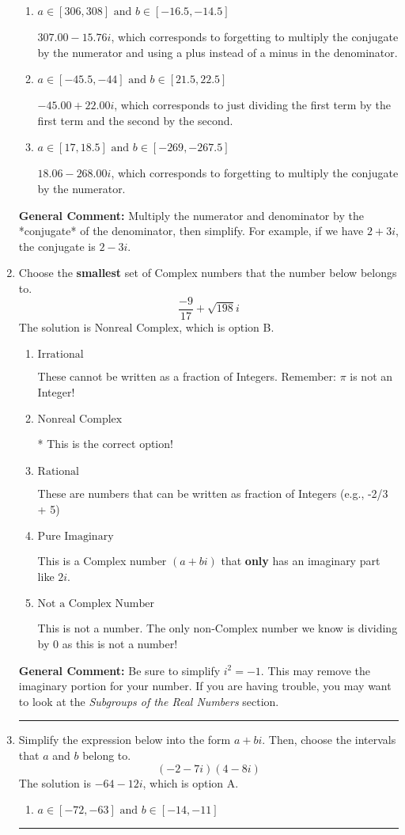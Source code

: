 \documentclass{extbook}[14pt]
\newcommand{\litem}[1]{\item #1

\rule{\textwidth}{0.4pt}}
\begin{document}
\begin{enumerate}
{\begin{enumerate}[label=\Alph*.]
 $-23.35  + 5.41 i$, which corresponds to forgetting to multiply the conjugate by the numerator and not computing the conjugate correctly.
\item \( a \in [306, 308] \text{ and } b \in [-16.5, -14.5] \)

 $307.00  - 15.76 i$, which corresponds to forgetting to multiply the conjugate by the numerator and using a plus instead of a minus in the denominator.
\item \( a \in [-45.5, -44] \text{ and } b \in [21.5, 22.5] \)

 $-45.00  + 22.00 i$, which corresponds to just dividing the first term by the first term and the second by the second.
\item \( a \in [17, 18.5] \text{ and } b \in [-269, -267.5] \)

 $18.06  - 268.00 i$, which corresponds to forgetting to multiply the conjugate by the numerator.
\end{enumerate}

\textbf{General Comment:} Multiply the numerator and denominator by the *conjugate* of the denominator, then simplify. For example, if we have $2+3i$, the conjugate is $2-3i$.
}
\litem{
Choose the \textbf{smallest} set of Complex numbers that the number below belongs to.
\[ \frac{-9}{17}+\sqrt{198} i \]
The solution is \( \text{Nonreal Complex} \), which is option B.\begin{enumerate}[label=\Alph*.]
\item \( \text{Irrational} \)

These cannot be written as a fraction of Integers. Remember: $\pi$ is not an Integer!
\item \( \text{Nonreal Complex} \)

* This is the correct option!
\item \( \text{Rational} \)

These are numbers that can be written as fraction of Integers (e.g., -2/3 + 5)
\item \( \text{Pure Imaginary} \)

This is a Complex number $(a+bi)$ that \textbf{only} has an imaginary part like $2i$.
\item \( \text{Not a Complex Number} \)

This is not a number. The only non-Complex number we know is dividing by 0 as this is not a number!
\end{enumerate}

\textbf{General Comment:} Be sure to simplify $i^2 = -1$. This may remove the imaginary portion for your number. If you are having trouble, you may want to look at the \textit{Subgroups of the Real Numbers} section.
}
\litem{
Simplify the expression below into the form $a+bi$. Then, choose the intervals that $a$ and $b$ belong to.
\[ (-2 - 7 i)(4 - 8 i) \]
The solution is \( -64 - 12 i \), which is option A.\begin{enumerate}[label=\Alph*.]
\item \( a \in [-72, -63] \text{ and } b \in [-14, -11] \)


\end{enumerate}}
\end{enumerate}
\end{document}
